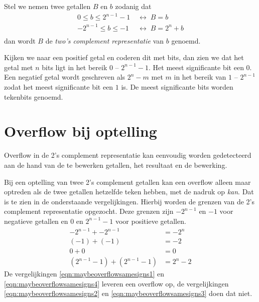 \documentclass[a4paper,12pt,oneside]{article}
\theoremstyle{own}
\newtheorem{example}{Voorbeeld}[section]
\begin{document}
Stel we nemen twee getallen $B$ en $b$ zodanig dat
%
\begin{equation}
\begin{split}
0 \leq b \leq 2^{n-1}-1 &\;\leftrightarrow\; B = b \\
-2^{n-1} \leq b \leq -1 &\;\leftrightarrow\; B = 2^n + b \\
\end{split}
\end{equation}
%
dan wordt $B$ de \textsl{two's complement representatie} van $b$ genoemd.

Kijken we naar een positief getal en coderen dit met bits, dan zien we
dat het getal met $n$ bits ligt in het bereik $0$ -- $2^{n-1}-1$. Het meest
significante bit een $0$. Een negatief getal wordt geschreven als $2^n - m$
met $m$ in het bereik van $1$ -- $2^{n-1}$ zodat het meest significante bit
een $1$ is. De meest significante bits worden tekenbits genoemd.

%

\section{Overflow bij optelling}
Overflow in de 2's complement representatie kan eenvoudig worden gedetecteerd
aan de hand van de te bewerken getallen, het resultaat en de bewerking.


Bij een optelling van twee 2's complement getallen kan een overflow alleen
maar optreden als de twee getallen hetzelfde teken hebben, met de nadruk op
\textsl{kan}. Dat is te zien in de onderstaande vergelijkingen. Hierbij worden
de grenzen van de 2's complement representatie opgezocht. Deze grenzen zijn
$-2^{n-1}$ en $-1$ voor negatieve getallen en $0$ en $2^{n-1}-1$ voor
positieve getallen.
%
\begin{align}
\label{eqn:maybeoverflowsamesigns1}
      -2^{n-1} + -2^{n-1} &= -2^{n} \\
\label{eqn:maybeoverflowsamesigns2}
              (-1) + (-1) &= -2 \\
\label{eqn:maybeoverflowsamesigns3}
                    0 + 0 &= 0 \\
\label{eqn:maybeoverflowsamesigns4}
(2^{n-1}-1) + (2^{n-1}-1) &= 2^n -2
\end{align}
%
De vergelijkingen \ref{eqn:maybeoverflowsamesigns1} en
\ref{eqn:maybeoverflowsamesigns4} leveren een overflow op, de vergelijkingen
\ref{eqn:maybeoverflowsamesigns2} en \ref{eqn:maybeoverflowsamesigns3} doen
dat niet.
\end{document}
